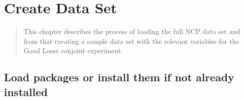 \documentclass[]{book}
\begin{document}
\chapter{Create Data Set}\label{create-data-set-2}

\begin{quote}
This chapter describes the process of loading the full NCP data set and
from that creating a sample data set with the relevant variables for the
Good Loser conjoint experiment.
\end{quote}

\section{Load packages or install them if not already
installed}\label{load-packages-or-install-them-if-not-already-installed-2}
\end{document}
